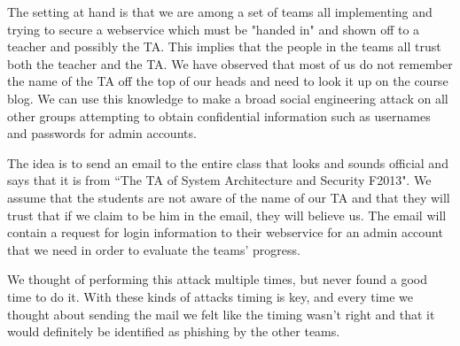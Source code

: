 \documentclass[a4paper]{article}
\begin{document}
The setting at hand is that we are among a set of teams all implementing and trying to secure a webservice which must be "handed in" and shown off to a teacher and possibly the TA. This implies that the people in the teams all trust both the teacher and the TA. We have observed that most of us do not remember the name of the TA off the top of our heads and need to look it up on the course blog.
We can use this knowledge to make a broad social engineering attack on all other groups attempting to obtain confidential information such as usernames and passwords for admin accounts.

The idea is to send an email to the entire class that looks and sounds official and says that it is from ``The TA of System Architecture and Security F2013". We assume that the students are not aware of the name of our TA and that they will trust that if we claim to be him in the email, they will believe us. The email will contain a request for login information to their webservice for an admin account that we need in order to evaluate the teams' progress.

We thought of performing this attack multiple times, but never found a good time to do it. With these kinds of attacks timing is key, and every time we thought about sending the mail we felt like the timing wasn't right and that it would definitely be identified as phishing by the other teams.





\end{document}
